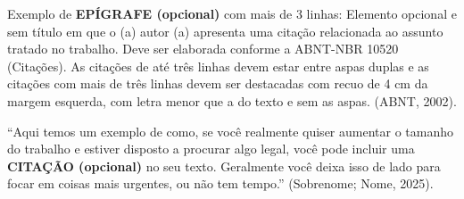 
\vspace*{10cm}
\begin{citacao}
Exemplo de \textbf{EPÍGRAFE (opcional)} com mais de 3 linhas: Elemento opcional e sem título em que o (a) autor (a) apresenta uma citação relacionada ao assunto tratado no trabalho. Deve ser elaborada conforme a ABNT-NBR 10520 (Citações). As citações de até três linhas devem estar entre aspas duplas e as citações com mais de três linhas devem ser destacadas com recuo de 4 cm da margem esquerda, com letra menor que a do texto e sem as aspas. (ABNT, 2002).
\end{citacao}

    \vspace*{5cm}
	
		\enquote{Aqui temos um exemplo de como, se você realmente quiser aumentar o tamanho do trabalho e estiver disposto a procurar algo legal, você pode incluir uma \textbf{CITAÇÃO (opcional)} no seu texto. Geralmente você deixa isso de lado para focar em coisas mais urgentes, ou não tem tempo.} (Sobrenome; Nome, 2025).
	
\newpage